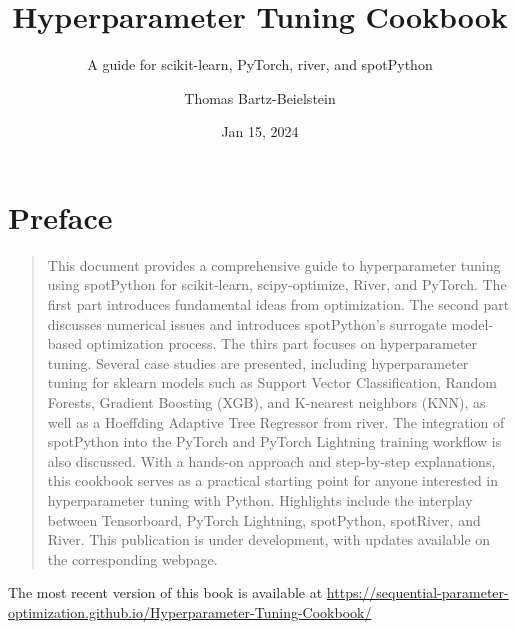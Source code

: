 \documentclass[
  letterpaper,
  DIV=11,
  numbers=noendperiod]{scrreprt}
\title{Hyperparameter Tuning Cookbook}
\subtitle{A guide for scikit-learn, PyTorch, river, and spotPython}
\author{Thomas Bartz-Beielstein}
\date{Jan 15, 2024}
\renewcommand*\contentsname{Table of contents}
\newcommand\contentsname{Table of contents}
\begin{document}
\maketitle

\renewcommand*\contentsname{Table of contents}
{
\hypersetup{linkcolor=}
\setcounter{tocdepth}{2}
\tableofcontents
}

\chapter*{Preface}\label{preface}


\begin{quote}
This document provides a comprehensive guide to hyperparameter tuning
using spotPython for scikit-learn, scipy-optimize, River, and PyTorch.
The first part introduces fundamental ideas from optimization. The
second part discusses numerical issues and introduces spotPython's
surrogate model-based optimization process. The thirs part focuses on
hyperparameter tuning. Several case studies are presented, including
hyperparameter tuning for sklearn models such as Support Vector
Classification, Random Forests, Gradient Boosting (XGB), and K-nearest
neighbors (KNN), as well as a Hoeffding Adaptive Tree Regressor from
river. The integration of spotPython into the PyTorch and PyTorch
Lightning training workflow is also discussed. With a hands-on approach
and step-by-step explanations, this cookbook serves as a practical
starting point for anyone interested in hyperparameter tuning with
Python. Highlights include the interplay between Tensorboard, PyTorch
Lightning, spotPython, spotRiver, and River. This publication is under
development, with updates available on the corresponding webpage.
\end{quote}

\begin{tcolorbox}[enhanced jigsaw, rightrule=.15mm, coltitle=black, title=\textcolor{quarto-callout-important-color}{\faExclamation}\hspace{0.5em}{Important: This book is still under development.}, opacitybacktitle=0.6, bottomrule=.15mm, opacityback=0, left=2mm, colback=white, leftrule=.75mm, colframe=quarto-callout-important-color-frame, colbacktitle=quarto-callout-important-color!10!white, toprule=.15mm, toptitle=1mm, bottomtitle=1mm, titlerule=0mm, breakable, arc=.35mm]

The most recent version of this book is available at
\url{https://sequential-parameter-optimization.github.io/Hyperparameter-Tuning-Cookbook/}

\end{tcolorbox}
\end{document}
